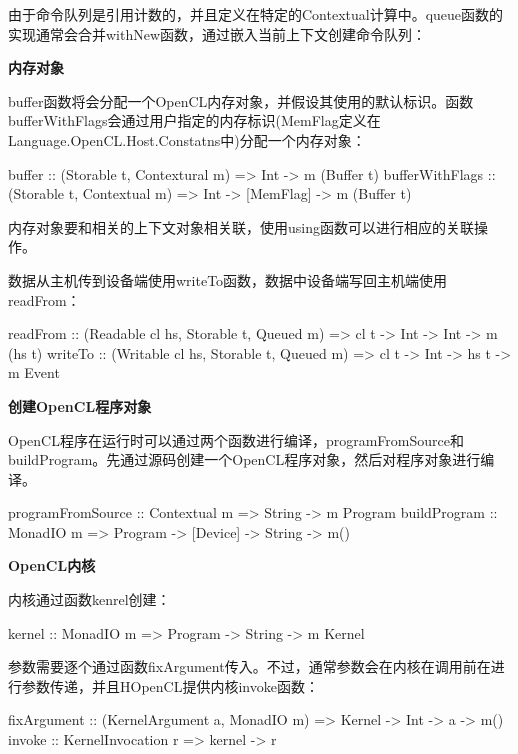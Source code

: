 由于命令队列是引用计数的，并且定义在特定的Contextual计算中。queue函数的实现通常会合并withNew函数，通过嵌入当前上下文创建命令队列：


\textbf{内存对象}

buffer函数将会分配一个OpenCL内存对象，并假设其使用的默认标识。函数bufferWithFlags会通过用户指定的内存标识(MemFlag定义在Language.OpenCL.Host.Constatns中)分配一个内存对象：

\begin{codebox}[haskell]
buffer :: (Storable t, Contextural m) => Int -> m (Buffer t)
bufferWithFlags :: (Storable t, Contextual m) => Int -> [MemFlag] -> m (Buffer t)
\end{codebox}

内存对象要和相关的上下文对象相关联，使用using函数可以进行相应的关联操作。

数据从主机传到设备端使用writeTo函数，数据中设备端写回主机端使用readFrom：

\begin{codebox}[haskell]
readFrom :: (Readable cl hs, Storable t, Queued m) => cl t -> Int -> Int -> m (hs t)
writeTo :: (Writable cl hs, Storable t, Queued m) => cl t -> Int -> hs t -> m Event
\end{codebox}

\textbf{创建OpenCL程序对象}

OpenCL程序在运行时可以通过两个函数进行编译，programFromSource和buildProgram。先通过源码创建一个OpenCL程序对象，然后对程序对象进行编译。

\begin{codebox}[haskell]
programFromSource :: Contextual m => String -> m Program
buildProgram :: MonadIO m => Program -> [Device] -> String -> m()
\end{codebox}

\textbf{OpenCL内核}

内核通过函数kenrel创建：

\begin{codebox}[haskell]
kernel :: MonadIO m => Program -> String -> m Kernel
\end{codebox}

参数需要逐个通过函数fixArgument传入。不过，通常参数会在内核在调用前在进行参数传递，并且HOpenCL提供内核invoke函数：

\begin{codebox}[haskell]
fixArgument :: (KernelArgument a, MonadIO m) => Kernel -> Int -> a -> m()
invoke :: KernelInvocation r => kernel -> r
\end{codebox}

